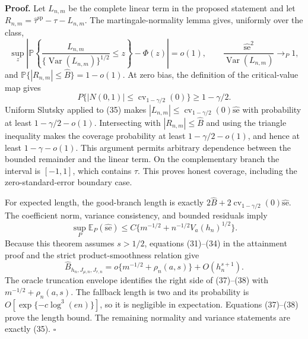 \textbf{Proof.}
Let \(L_{n,m}\) be the complete linear term in the proposed statement and let \(R_{n,m}=\widehat\tau^{\mathrm{sp}}-\tau-L_{n,m}\).  The martingale-normality lemma gives, uniformly over the class,
\[
 \sup_z\left|\mathbb P\left\{
 \frac{L_{n,m}}{\{\operatorname{Var}(L_{n,m})\}^{1/2}}\le z\right\}-\Phi(z)\right|=o(1),
 \qquad
 \frac{\widehat{\mathrm{se}}^2}{\operatorname{Var}(L_{n,m})}\longrightarrow_P1,
\tag{35}
\]
and \(\mathbb P\{|R_{n,m}|\le\widehat B\}=1-o(1)\).  At zero bias, the definition of the critical-value map gives
\[
 P\{|N(0,1)|\le\operatorname{cv}_{1-\gamma/2}(0)\}
 \ge1-\gamma/2.
\tag{36}
\]
Uniform Slutsky applied to (35) makes \(|L_{n,m}|\le\operatorname{cv}_{1-\gamma/2}(0)\widehat{\mathrm{se}}\) with probability at least \(1-\gamma/2-o(1)\).  Intersecting with \(|R_{n,m}|\le\widehat B\) and using the triangle inequality makes the coverage probability at least \(1-\gamma/2-o(1)\), and hence at least \(1-\gamma-o(1)\).  This argument permits arbitrary dependence between the bounded remainder and the linear term.  On the complementary branch the interval is \([-1,1]\), which contains \(\tau\).  This proves honest coverage, including the zero-standard-error boundary case.

For expected length, the good-branch length is exactly \(2\widehat B+2\operatorname{cv}_{1-\gamma/2}(0)\widehat{\mathrm{se}}\).  The coefficient norm, variance consistency, and bounded residuals imply
\[
 \sup_P\mathbb E_P(\widehat{\mathrm{se}})
 \le C\{m^{-1/2}+n^{-1/2}V_a(h_n)^{1/2}\}.
\tag{37}
\]
Because this theorem assumes \(s>1/2\), equations (31)--(34) in the attainment proof and the strict product-smoothness relation give
\[
 \widehat B_{h_n,J_{\mu,n},J_{r,n}}
 =o\{m^{-1/2}+\rho_n(a,s)\}+O(h_n^{s+1}).
\tag{38}
\]
The oracle truncation envelope identifies the right side of (37)--(38) with \(m^{-1/2}+\rho_n(a,s)\).  The fallback length is two and its probability is \(O[\exp\{-c\log^3(en)\}]\), so it is negligible in expectation.  Equations (37)--(38) prove the length bound.  The remaining normality and variance statements are exactly (35). \(\square\)